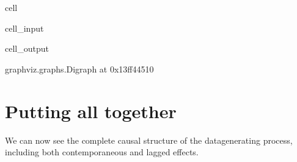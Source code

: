 \documentclass[letterpaper,10pt,english]{jupyterBook}
\begin{document}
\begin{sphinxuseclass}{cell}\begin{sphinxVerbatimInput}

\begin{sphinxuseclass}{cell_input}
\begin{sphinxVerbatim}[commandchars=\\\{\}]
  \PYG{p}{[}  \PYG{p}{]}
 
\end{sphinxVerbatim}

\end{sphinxuseclass}\end{sphinxVerbatimInput}
\begin{sphinxVerbatimOutput}

\begin{sphinxuseclass}{cell_output}
\begin{sphinxVerbatim}[commandchars=\\\{\}]
\PYGZlt{}graphviz.graphs.Digraph at 0x13ff44510\PYGZgt{}
\end{sphinxVerbatim}

\end{sphinxuseclass}\end{sphinxVerbatimOutput}

\end{sphinxuseclass}

\section{Putting all together}
\label{\detokenize{notebooks/semiparametric_varlingam:putting-all-together}}
\sphinxAtStartPar
We can now see the complete causal structure of the data\sphinxhyphen{}generating process, including both contemporaneous and lagged effects.
\end{document}
